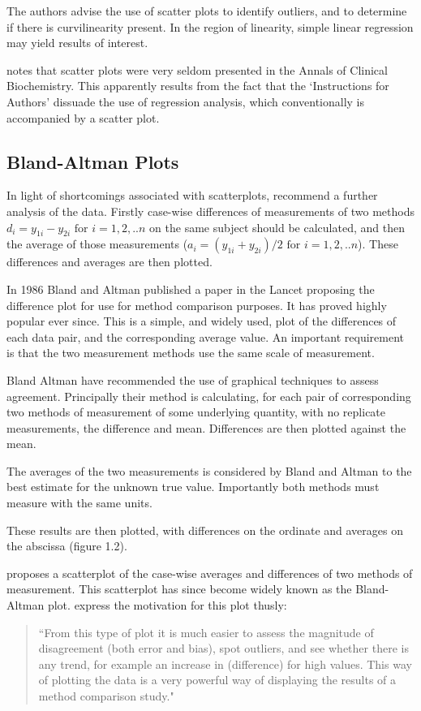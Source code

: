 \documentclass[Main.tex]{subfiles}
\begin{document}
The authors advise the use of scatter plots to identify outliers, and to determine if there is curvilinearity present. In the region of linearity, simple linear regression may yield results of interest.

\citet{Dewitte} notes that scatter plots were very seldom presented in the Annals of Clinical Biochemistry. This apparently results from the fact that the `Instructions for Authors' dissuade the use of regression analysis, which conventionally is accompanied by a scatter plot.



\subsection{Bland-Altman Plots}




In light of shortcomings associated with scatterplots, \citet*{BA83} recommend a further analysis of the data. Firstly
case-wise differences of measurements of two methods $d_{i} = y_{1i}-y_{2i} \mbox{ for }i=1,2,..n$ on the same subject should be calculated, and then the average of those measurements ($a_{i} = (y_{1i} + y_{2i})/2 \mbox{ for }i=1,2,..n$). These differences and
averages are then plotted. 

In 1986 Bland and Altman published a paper in the Lancet proposing the difference plot for use for method comparison purposes. It has
proved highly popular ever since. This is a simple, and widely used, plot of the differences of each data pair, and the corresponding average value. An important requirement is that the two measurement methods use the same scale of measurement.

Bland Altman have recommended the use of graphical techniques to assess agreement.
Principally their method is calculating, for each pair of corresponding two methods of measurement of some underlying quantity, with no replicate measurements, the difference and mean. Differences are then plotted against the mean.

The averages of the two measurements is considered by
	Bland and Altman to the best estimate for the unknown true value.
	Importantly both methods must measure with the same units. 
	
	These
	results are then plotted, with differences on the ordinate and
	averages on the abscissa (figure 1.2).



\citet{BA83} proposes a scatterplot of the case-wise averages and differences of two methods of measurement. This scatterplot has since become widely known as the Bland-Altman plot. \citet*{BA83} express the
motivation for this plot thusly:
\begin{quote}
	``From this type of plot it is much easier to assess the magnitude
	of disagreement (both error and bias), spot outliers, and see
	whether there is any trend, for example an increase in (difference) for high values. This way of plotting the data is a very powerful way of displaying the results of a method comparison study."
\end{quote}
\end{document}
